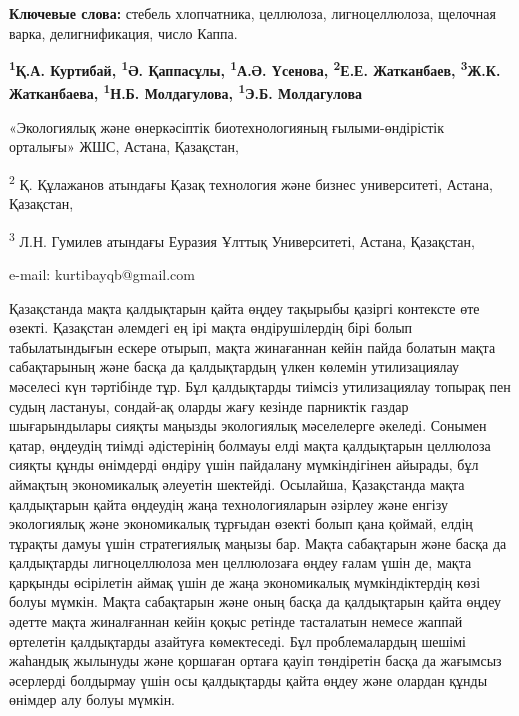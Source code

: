 {\bfseries Ключевые слова:} стебель хлопчатника, целлюлоза, лигноцеллюлоза,
щелочная варка, делигнификация, число Каппа.


\begin{center}
{\bfseries \textsuperscript{1}Қ.А. Куртибай, \textsuperscript{1}Ә.
Қаппасұлы, \textsuperscript{1}А.Ә. Үсенова, \textsuperscript{2}Е.Е.
Жатканбаев, \textsuperscript{3}Ж.К. Жатканбаева, \textsuperscript{1}Н.Б.
Молдагулова, \textsuperscript{1}Э.Б. Молдагулова}

«Экологиялық және өнеркәсіптік биотехнологияның ғылыми-өндірістік
орталығы» ЖШС, Астана, Қазақстан,

\textsuperscript{2} Қ. Құлажанов атындағы Қазақ технология және бизнес
университеті, Астана, Қазақстан,

\textsuperscript{3} Л.Н. Гумилев атындағы Еуразия Ұлттық Университеті,
Астана, Қазақстан,

e-mail: kurtibayqb@gmail.com
\end{center}

Қазақстанда мақта қалдықтарын қайта өңдеу тақырыбы қазіргі контексте өте
өзекті. Қазақстан әлемдегі ең ірі мақта өндірушілердің бірі болып
табылатындығын ескере отырып, мақта жинағаннан кейін пайда болатын мақта
сабақтарының және басқа да қалдықтардың үлкен көлемін утилизациялау
мәселесі күн тәртібінде тұр. Бұл қалдықтарды тиімсіз утилизациялау
топырақ пен судың ластануы, сондай-ақ оларды жағу кезінде парниктік
газдар шығарындылары сияқты маңызды экологиялық мәселелерге әкеледі.
Сонымен қатар, өңдеудің тиімді әдістерінің болмауы елді мақта
қалдықтарын целлюлоза сияқты құнды өнімдерді өндіру үшін пайдалану
мүмкіндігінен айырады, бұл аймақтың экономикалық әлеуетін шектейді.
Осылайша, Қазақстанда мақта қалдықтарын қайта өңдеудің жаңа
технологияларын әзірлеу және енгізу экологиялық және экономикалық
тұрғыдан өзекті болып қана қоймай, елдің тұрақты дамуы үшін стратегиялық
маңызы бар. Мақта сабақтарын және басқа да қалдықтарды лигноцеллюлоза
мен целлюлозаға өңдеу ғалам үшін де, мақта қарқынды өсірілетін аймақ
үшін де жаңа экономикалық мүмкіндіктердің көзі болуы мүмкін. Мақта
сабақтарын және оның басқа да қалдықтарын қайта өңдеу әдетте мақта
жиналғаннан кейін қоқыс ретінде тасталатын немесе жаппай өртелетін
қалдықтарды азайтуға көмектеседі. Бұл проблемалардың шешімі жаһандық
жылынуды және қоршаған ортаға қауіп төндіретін басқа да жағымсыз
әсерлерді болдырмау үшін осы қалдықтарды қайта өңдеу және олардан құнды
өнімдер алу болуы мүмкін.

